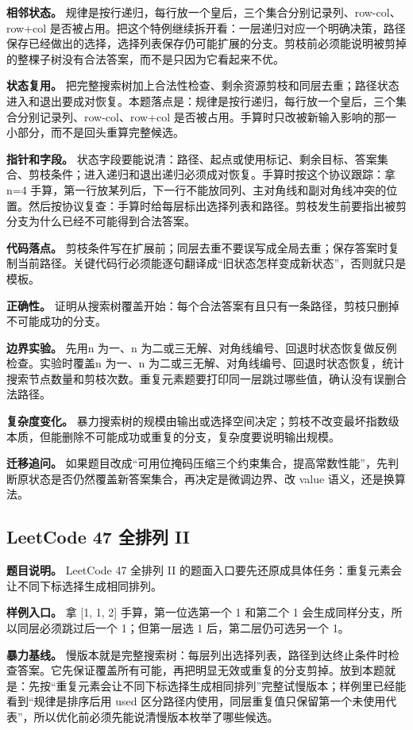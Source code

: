 \textbf{相邻状态。} 规律是按行递归，每行放一个皇后，三个集合分别记录列、row-col、row+col 是否被占用。把这个特例继续拆开看：一层递归对应一个明确决策，路径保存已经做出的选择，选择列表保存仍可能扩展的分支。剪枝前必须能说明被剪掉的整棵子树没有合法答案，而不是只因为它看起来不优。

\textbf{状态复用。} 把完整搜索树加上合法性检查、剩余资源剪枝和同层去重；路径状态进入和退出要成对恢复。本题落点是：规律是按行递归，每行放一个皇后，三个集合分别记录列、row-col、row+col 是否被占用。手算时只改被新输入影响的那一小部分，而不是回头重算完整候选。

\textbf{指针和字段。} 状态字段要能说清：路径、起点或使用标记、剩余目标、答案集合、剪枝条件；进入递归和退出递归必须成对恢复。手算时按这个协议跟踪：拿 n=4 手算，第一行放某列后，下一行不能放同列、主对角线和副对角线冲突的位置。然后按协议复查：手算时给每层标出选择列表和路径。剪枝发生前要指出被剪分支为什么已经不可能得到合法答案。

\textbf{代码落点。} 剪枝条件写在扩展前；同层去重不要误写成全局去重；保存答案时复制当前路径。关键代码行必须能逐句翻译成“旧状态怎样变成新状态”，否则就只是模板。

\textbf{正确性。} 证明从搜索树覆盖开始：每个合法答案有且只有一条路径，剪枝只删掉不可能成功的分支。

\textbf{边界实验。} 先用n 为一、n 为二或三无解、对角线编号、回退时状态恢复做反例检查。实验时覆盖n 为一、n 为二或三无解、对角线编号、回退时状态恢复，统计搜索节点数量和剪枝次数。重复元素题要打印同一层跳过哪些值，确认没有误删合法路径。

\textbf{复杂度变化。} 暴力搜索树的规模由输出或选择空间决定；剪枝不改变最坏指数级本质，但能删除不可能成功或重复的分支，复杂度要说明输出规模。

\textbf{迁移追问。} 如果题目改成“可用位掩码压缩三个约束集合，提高常数性能”，先判断原状态是否仍然覆盖新答案集合，再决定是微调边界、改 value 语义，还是换算法。

\subsection{LeetCode 47 全排列 II}

\textbf{题目说明。} LeetCode 47 全排列 II 的题面入口要先还原成具体任务：重复元素会让不同下标选择生成相同排列。

\textbf{样例入口。} 拿 [1, 1, 2] 手算，第一位选第一个 1 和第二个 1 会生成同样分支，所以同层必须跳过后一个 1；但第一层选 1 后，第二层仍可选另一个 1。

\textbf{暴力基线。} 慢版本就是完整搜索树：每层列出选择列表，路径到达终止条件时检查答案。它先保证覆盖所有可能，再把明显无效或重复的分支剪掉。放到本题就是：先按“重复元素会让不同下标选择生成相同排列”完整试慢版本；样例里已经能看到“规律是排序后用 used 区分路径内使用，同层重复值只保留第一个未使用代表”，所以优化前必须先能说清慢版本枚举了哪些候选。

